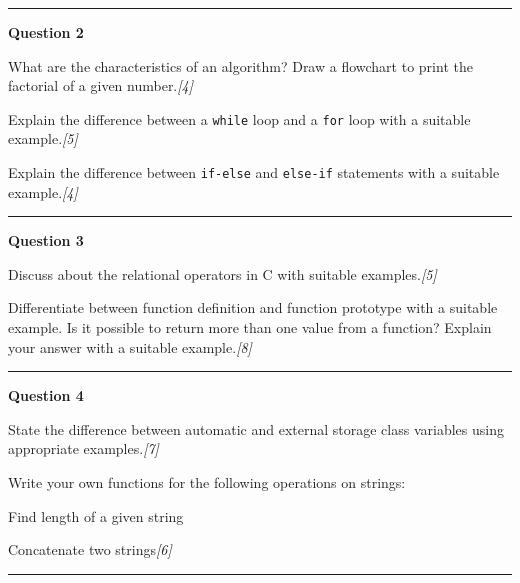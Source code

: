 \documentclass[11pt,a4paper]{article}
\newcommand{\pts}[1]{\hfill   \textit{[#1]}}
\begin{document}
\medskip\rule{\linewidth}{0.2pt}\medskip




\noindent   \textbf{Question 2}

\begin{parts}
  \item What are the characteristics of an algorithm? Draw a flowchart to print the factorial of a given number.\pts{4}
  \item Explain the difference between a   \texttt{while} loop and a   \texttt{for} loop with a suitable example.\pts{5}
  \item Explain the difference between   \texttt{if-else} and   \texttt{else-if} statements with a suitable example.\pts{4}
\end{parts}

\medskip\rule{\linewidth}{0.2pt}\medskip




\noindent   \textbf{Question 3}

\begin{parts}
  \item Discuss about the relational operators in C with suitable examples.\pts{5}
  \item Differentiate between function definition and function prototype with a suitable example. Is it possible to return more than one value from a function? Explain your answer with a suitable example.\pts{8}
\end{parts}

\medskip\rule{\linewidth}{0.2pt}\medskip




\noindent   \textbf{Question 4}

\begin{parts}
  \item State the difference between automatic and external storage class variables using appropriate examples.\pts{7}
  \item Write your own functions for the following operations on strings:
  
\begin{parts}
    \item Find length of a given string
    \item Concatenate two strings\pts{6}
  \end{parts}
\end{parts}

\medskip\rule{\linewidth}{0.2pt}\medskip
\end{document}
